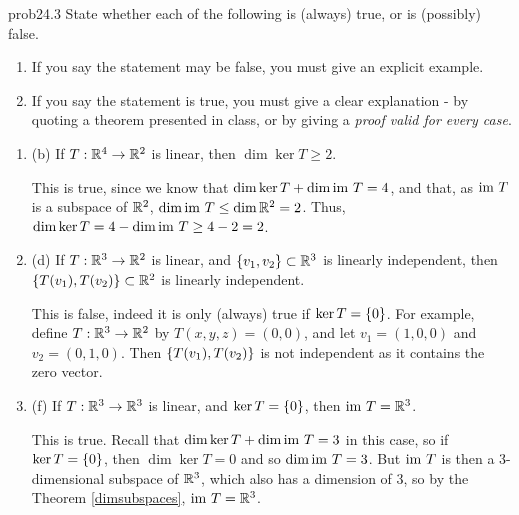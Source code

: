 \begin{sol}{prob24.3} State whether each of the following is (always) true,
or is (possibly) false.    
   \smallskip    
\begin{enumerate}[$\bullet$]
\item If you say the statement may be false, you must give an explicit example.   
\item If you say the statement is true, you must give a clear explanation -   by quoting a theorem presented in class, or by giving a {\it proof valid for every  case}. 
\end{enumerate}

\medskip
\begin{enumerate}[]
 

\item (b) If $T:\mathbb{R}^4 \to \mathbb{R}^2$ is linear, then $\dim \ker T \ge 2$.

\soln This is true, since we know that $\dim \ker T + \dim \operatorname{im}\, T =4$, and that, as $\operatorname{im}\, T$ is a subspace of $\mathbb{R}^2$, $\dim \operatorname{im}\, T \le \dim \mathbb{R}^2 =2$. Thus, $\dim \ker T =4- \dim \operatorname{im}\, T \ge 4-2 =2$.
\medskip
% 

 
\item (d) If $T:\mathbb{R}^3 \to \mathbb{R}^2$ is linear, and $\{v_1,v_2 \} \subset \mathbb{R}^3$ is linearly independent, then $\{T(v_1),T(v_2) \} \subset \mathbb{R}^2$ is linearly independent.

\soln This is false, indeed it is only (always) true if $\ker T=\{0 \}$. For example, define $T:\mathbb{R}^3 \to \mathbb{R}^2$ by $T(x,y,z)=(0,0)$, and let $v_1=(1,0,0)$ and $v_2=(0,1,0)$. Then $\{T(v_1), T(v_2) \}$ is not independent as it contains the zero vector.
\medskip
%


\item (f) If $T:\mathbb{R}^3 \to \mathbb{R}^3$ is linear, and $\ker T=\{0 \}$, then $\operatorname{im}\, T=\mathbb{R}^3$.

\soln This is true. Recall that $\dim \ker T + \dim \operatorname{im}\, T =3$ in this case, so if $\ker T=\{0 \}$, then $\dim \ker T=0$ and so $\dim \operatorname{im}\, T =3$. But $\operatorname{im}\, T$ is then a 3-dimensional subspace of $\mathbb{R}^3$, which also has a dimension of $3$, so by the Theorem \ref{dimsubspaces}, $\operatorname{im}\, T= \mathbb{R}^3$.
\medskip

\end{enumerate}

\end{sol}

